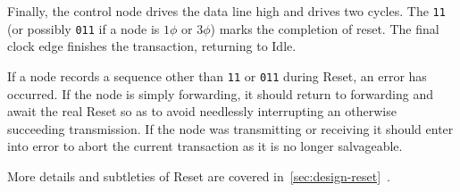 Finally, the control node drives the data line high and drives two cycles. The
{\tt 11} (or possibly {\tt 011} if a node is $1\phi$ or $3\phi$) marks the
completion of reset. The final clock edge finishes the transaction, returning
\bus to Idle.

If a node records a sequence other than {\tt 11} or {\tt 011} during Reset, an
error has occurred. If the node is simply forwarding, it should return to
forwarding and await the real Reset so as to avoid needlessly interrupting an
otherwise succeeding transmission. If the node was transmitting or receiving
it should enter into {\sc error} to abort the current transaction as it is no
longer salvageable.

More details and subtleties of Reset are covered
in~\ref{sec:design-reset}~.
